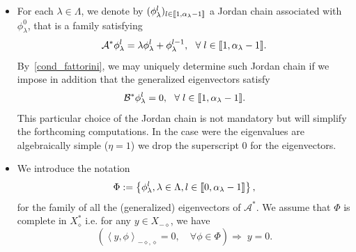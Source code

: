 \documentclass[AHL,Unicode,longabstracts]{cedram}
\newcommand{\llbracket}{\mathopen{[\mkern -2.7mu[}}
\newcommand{\rrbracket}{\mathclose{]\mkern -2.7mu]}}
\newcommand{\inter}[2]{\llbracket #1,#2 \rrbracket}
\newcommand\As{\mathcal{A}^*}
\newcommand\Bs{\mathcal{B}^*}
\newcommand{\Xalphas}{X_\diamond^*}
\newcommand{\Xmalpha}{X_{-\diamond}}
\newcommand{\Fzp}{Y_0}
\newcommand{\dual}[2]{\left\langle #1, #2 \right\rangle_{-\diamond,\diamond}}
\let\oldforall\forall
\renewcommand*{\forall}{\mathrel{\oldforall}}
\begin{document}
\begin{itemize}
As we are interested in null-controllability properties of system~\eqref{systeme}, we will first assume that
\begin{equation}\label{cond_fattorini}
\Bs \phi_\lambda^0 \neq 0, \ \ \text{for any } \lambda\in \Lambda.
\end{equation}
This is a necessary condition for the approximate controllability of system~\eqref{systeme}, and is therefore mandatory if we expect null-controllability to hold. In our setting, the assumption~\eqref{cond_fattorini} is also a sufficient condition for approximate controllability (see~\cite{Fattorini66, Olive13}).

When the considered set of initial data $\Fzp$ is not the whole space $\Xmalpha$, the approximate controllability condition~\eqref{cond_fattorini} can be too strong and we can relax it. We will discuss this point in Section~\ref{Sec:Gestion_de_B*}.


\item For each $\lambda\in \Lambda$, we denote by $(\phi_\lambda^l)_{l \in \inter{1}{\alpha_\lambda-1}}$ a Jordan chain associated with $\phi_\lambda^0$, that is a family satisfying
\begin{equation*}\label{def_chaine_Jordan}
\As \phi_\lambda^l = \lambda \phi_\lambda^l + \phi_\lambda^{l-1}, \ \ \forall l\in \inter{1}{\alpha_{\lambda}-1}.
\end{equation*}
By~\eqref{cond_fattorini}, we may uniquely determine such Jordan chain if we impose in addition that the generalized eigenvectors satisfy
\begin{equation}\label{normalisation_chaine_Jordan}
\Bs \phi_\lambda^l = 0, \ \ \forall l \in \inter{1}{\alpha_{\lambda}-1}.
\end{equation}
This particular choice of the Jordan chain is not mandatory but will simplify the forthcoming computations. In the case were the eigenvalues are algebraically simple ($\eta =1$) we drop the superscript $0$ for the eigenvectors.
\item We introduce the notation
\[
\Phi:=\left\{\phi_\lambda^l, \lambda\in \Lambda, l\in \inter{0}{\alpha_\lambda-1} \right\},
\]
for the family of all the (generalized) eigenvectors of $\As$. We assume that $\Phi$ is complete in $\Xalphas$ i.e. for any $y \in \Xmalpha$, we have
\begin{equation}\label{FamilleComplete}
\left(\dual{y}{\phi} =0, \quad \forall \phi\in \Phi \right) \Longrightarrow \; y=0.
\end{equation}
\end{itemize}
\end{document}
